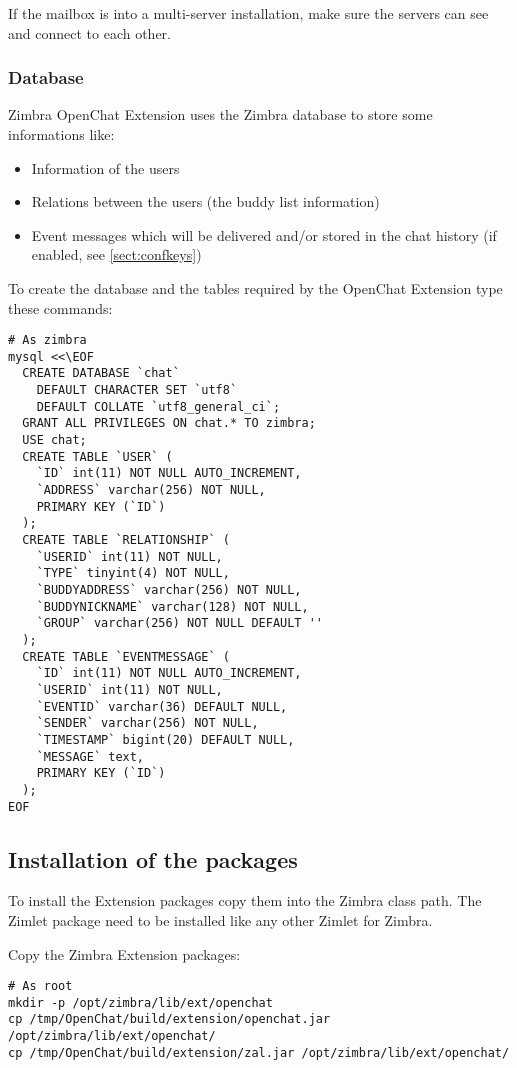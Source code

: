     If the mailbox is into a multi-server installation, make sure the servers can see and connect to each other.

\subsubsection{Database}

    Zimbra OpenChat Extension uses the Zimbra database to store some informations like:
    \begin{itemize}
        \item Information of the users
        \item Relations between the users (the buddy list information)
        \item Event messages which will be delivered and/or stored in the chat history (if enabled, see \autoref{sect:confkeys})
    \end{itemize}

    To create the database and the tables required by the OpenChat Extension type these commands:
    \begin{verbatim}
# As zimbra
mysql <<\EOF
  CREATE DATABASE `chat`
    DEFAULT CHARACTER SET `utf8`
    DEFAULT COLLATE `utf8_general_ci`;
  GRANT ALL PRIVILEGES ON chat.* TO zimbra;
  USE chat;
  CREATE TABLE `USER` (
    `ID` int(11) NOT NULL AUTO_INCREMENT,
    `ADDRESS` varchar(256) NOT NULL,
    PRIMARY KEY (`ID`)
  );
  CREATE TABLE `RELATIONSHIP` (
    `USERID` int(11) NOT NULL,
    `TYPE` tinyint(4) NOT NULL,
    `BUDDYADDRESS` varchar(256) NOT NULL,
    `BUDDYNICKNAME` varchar(128) NOT NULL,
    `GROUP` varchar(256) NOT NULL DEFAULT ''
  );
  CREATE TABLE `EVENTMESSAGE` (
    `ID` int(11) NOT NULL AUTO_INCREMENT,
    `USERID` int(11) NOT NULL,
    `EVENTID` varchar(36) DEFAULT NULL,
    `SENDER` varchar(256) NOT NULL,
    `TIMESTAMP` bigint(20) DEFAULT NULL,
    `MESSAGE` text,
    PRIMARY KEY (`ID`)
  );
EOF
    \end{verbatim}

\subsection{Installation of the packages}
\label{sect:installpkgs}

    To install the Extension packages copy them into the Zimbra class path. The Zimlet package need to be installed like
    any other Zimlet for Zimbra.

    Copy the Zimbra Extension packages:
    \begin{verbatim}
# As root
mkdir -p /opt/zimbra/lib/ext/openchat
cp /tmp/OpenChat/build/extension/openchat.jar /opt/zimbra/lib/ext/openchat/
cp /tmp/OpenChat/build/extension/zal.jar /opt/zimbra/lib/ext/openchat/
    \end{verbatim}

